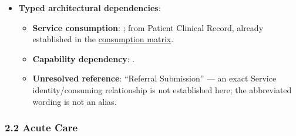 \begin{itemize}
\begin{itemize}
\begin{itemize}
\item
\emph{Exposed Service}: \texttt{} — Exposes aggregated multidisciplinary care timelines.



\end{itemize}


\end{itemize}


\item
\textbf{Typed architectural dependencies}:


\begin{itemize}

\item
\textbf{Service consumption}: \texttt{}; \texttt{} from Patient Clinical Record, already established in the \hyperref[rad:dependencies:46]{consumption matrix}.



\item
\textbf{Capability dependency}: \texttt{}.



\item
\textbf{Unresolved reference}: “Referral Submission” — an exact Service identity/\allowbreak{}consuming relationship is not established here; the abbreviated wording is not an alias.



\end{itemize}


\end{itemize}
\label{rad:sd:66}

\par\smallskip
{}\label{rad:sd:68}



\label{rad:sd:70}
\subsubsection*{2.2 Acute Care}
\label{rad:sd:71}

